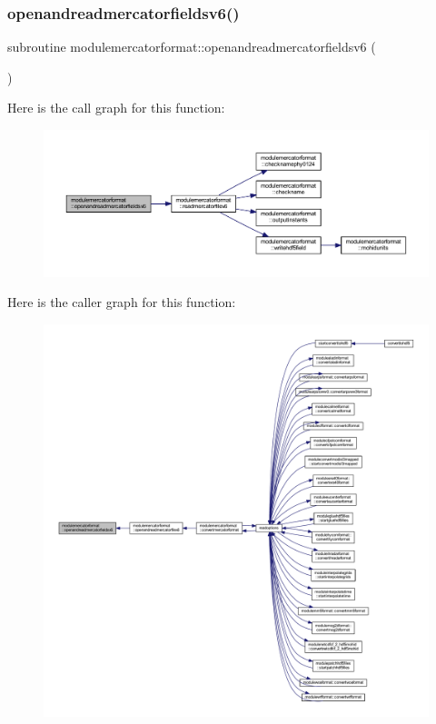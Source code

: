 \subsubsection{\texorpdfstring{openandreadmercatorfieldsv6()}{openandreadmercatorfieldsv6()}}
{\footnotesize\ttfamily subroutine modulemercatorformat\+::openandreadmercatorfieldsv6 (\begin{DoxyParamCaption}{ }\end{DoxyParamCaption})\hspace{0.3cm}{\ttfamily [private]}}

Here is the call graph for this function\+:\nopagebreak
\begin{figure}[H]
\begin{center}
\leavevmode
\includegraphics[width=350pt]{namespacemodulemercatorformat_a4cccec2de301fe19e324230b88faa275_cgraph}
\end{center}
\end{figure}
Here is the caller graph for this function\+:\nopagebreak
\begin{figure}[H]
\begin{center}
\leavevmode
\includegraphics[width=350pt]{namespacemodulemercatorformat_a4cccec2de301fe19e324230b88faa275_icgraph}
\end{center}
\end{figure}
\mbox{\label{namespacemodulemercatorformat_a2cf596b9eace6fa889296e8e6079f834}} 
